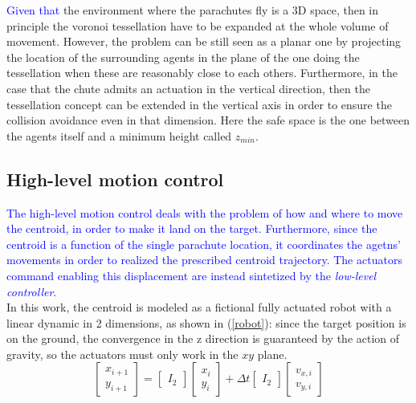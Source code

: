 \textcolor{blue}{Given that} the environment where the parachutes fly is a 3D space, then in principle the voronoi tessellation have to be expanded at the whole volume of movement. However, the problem can be still seen as a planar one by projecting the location of the surrounding agents in the plane of the one doing the tessellation when these are reasonably close to each others. Furthermore, in the case that the chute admits an actuation in the vertical direction, then the tessellation concept can be extended in the vertical axis in order to ensure the collision avoidance even in that dimension. Here the safe space is the one between the agents itself and a minimum height called $z_{min}$.
\subsection{High-level motion control}
\textcolor{blue}{The high-level motion control deals with the problem of how and where to move the centroid, in order to make it land on the target. Furthermore, since the centroid is a function of the single parachute location, it coordinates the agetns' movements in order to realized the prescribed centroid trajectory. The actuators command enabling this displacement are instead sintetized by the \textit{low-level controller}.}\\
In this work, the centroid is modeled as a fictional fully actuated robot with a linear dynamic in 2 dimensions, as shown in (\ref{robot}): since the target position is on the ground, the convergence in the z direction is guaranteed by the action of gravity, so the actuators must only work in the $xy$ plane.\\
\begin{equation}
    \begin{bmatrix}
        x_{i+1}\\
        y_{i+1}
    \end{bmatrix}=
    \begin{bmatrix}
        I_2
    \end{bmatrix}
    \begin{bmatrix}
        x_i\\
        y_i
    \end{bmatrix}
    +\Delta t\begin{bmatrix}
        I_2
    \end{bmatrix}
    \begin{bmatrix}
        v_{x,i}\\
        v_{y,i}
    \end{bmatrix}
    \label{robot}
\end{equation}

